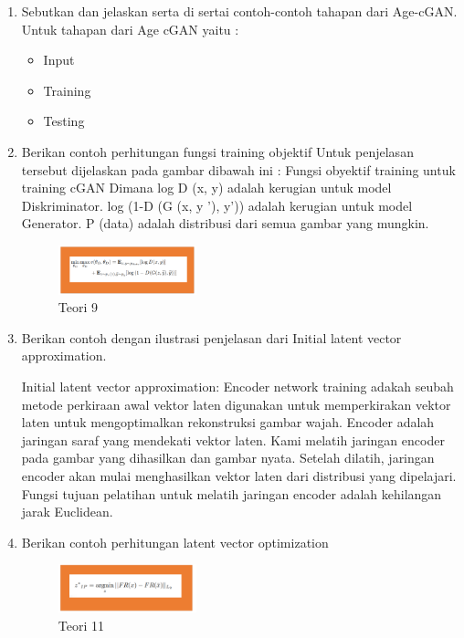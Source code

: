 \begin{enumerate}
	\item Sebutkan dan jelaskan serta di sertai contoh-contoh tahapan dari Age-cGAN.
	\hfill\break
	Untuk tahapan dari Age cGAN yaitu :
	\begin{itemize}
		\item Input
		\item Training
		\item Testing
	\end{itemize}

	\item Berikan contoh perhitungan fungsi training objektif
	\hfill\break
	Untuk penjelasan tersebut dijelaskan pada gambar dibawah ini :
	Fungsi obyektif training untuk training cGAN Dimana log D (x, y) adalah kerugian untuk model Diskriminator. log (1-D (G (x, y ’), y’)) adalah kerugian untuk model Generator. P (data) adalah distribusi dari semua gambar yang mungkin.

	\begin{figure}[H]
	\centering
		\includegraphics[width=4cm]{figures/1174005/tugas9/materi/teori9.PNG}
		\caption{Teori 9}
	\end{figure}

	\item Berikan contoh dengan ilustrasi penjelasan dari Initial latent vector approximation.
	\hfill\break

	Initial latent vector approximation: Encoder network training adakah seubah metode perkiraan awal vektor laten digunakan untuk memperkirakan vektor laten untuk mengoptimalkan rekonstruksi gambar wajah. Encoder adalah jaringan saraf yang mendekati vektor laten. Kami melatih jaringan encoder pada gambar yang dihasilkan dan gambar nyata. Setelah dilatih, jaringan encoder akan mulai menghasilkan vektor laten dari distribusi yang dipelajari. Fungsi tujuan pelatihan untuk melatih jaringan encoder adalah kehilangan jarak Euclidean.

	\item Berikan contoh perhitungan latent vector optimization
	\hfill\break

	\begin{figure}[H]
	\centering
		\includegraphics[width=4cm]{figures/1174005/tugas9/materi/teori11.PNG}
		\caption{Teori 11}
	\end{figure}
\end{enumerate}

